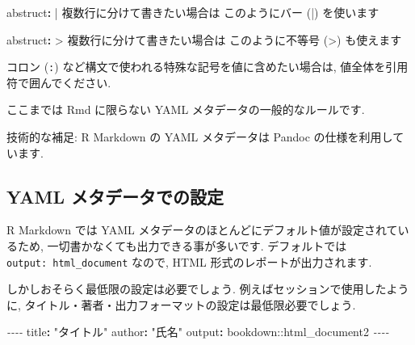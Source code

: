 \documentclass[
]{bxjsarticle}
\newenvironment{Shaded}{\begin{snugshade}}{\end{snugshade}}
\newcommand{\AttributeTok}[1]{\textcolor[rgb]{0.77,0.63,0.00}{#1}}
\newcommand{\CharTok}[1]{\textcolor[rgb]{0.31,0.60,0.02}{#1}}
\newcommand{\FunctionTok}[1]{\textcolor[rgb]{0.00,0.00,0.00}{#1}}
\newcommand{\KeywordTok}[1]{\textcolor[rgb]{0.13,0.29,0.53}{\textbf{#1}}}
\newcommand{\NormalTok}[1]{#1}
\newcommand{\PreprocessorTok}[1]{\textcolor[rgb]{0.56,0.35,0.01}{\textit{#1}}}
\newcommand{\StringTok}[1]{\textcolor[rgb]{0.31,0.60,0.02}{#1}}
\begin{document}
\begin{Shaded}
\begin{Highlighting}[numbers=left,,]
\FunctionTok{abstruct}\KeywordTok{: }\CharTok{|}
\NormalTok{  複数行に分けて書きたい場合は}
\NormalTok{  このようにバー (\textasciigrave{}|\textasciigrave{}) を使います}
\end{Highlighting}
\end{Shaded}

\begin{Shaded}
\begin{Highlighting}[numbers=left,,]
\FunctionTok{abstruct}\KeywordTok{: }\CharTok{\textgreater{}}
\NormalTok{  複数行に分けて書きたい場合は}
\NormalTok{  このように不等号 (\textasciigrave{}\textgreater{}\textasciigrave{}) も使えます}
\end{Highlighting}
\end{Shaded}

コロン (\texttt{:}) など構文で使われる特殊な記号を値に含めたい場合は, 値全体を引用符で囲んでください.

ここまでは Rmd に限らない YAML メタデータの一般的なルールです.

技術的な補足: R Markdown の YAML メタデータは Pandoc の仕様を利用しています.

\hypertarget{yaml-ux30e1ux30bfux30c7ux30fcux30bfux3067ux306eux8a2dux5b9a}{%
\subsection{YAML メタデータでの設定}\label{yaml-ux30e1ux30bfux30c7ux30fcux30bfux3067ux306eux8a2dux5b9a}}

R Markdown では YAML メタデータのほとんどにデフォルト値が設定されているため, 一切書かなくても出力できる事が多いです. デフォルトでは \texttt{output:\ html\_document} なので, HTML 形式のレポートが出力されます.

しかしおそらく最低限の設定は必要でしょう. 例えばセッションで使用したように, タイトル・著者・出力フォーマットの設定は最低限必要でしょう.

\begin{Shaded}
\begin{Highlighting}[numbers=left,,]
\PreprocessorTok{{-}{-}{-}{-}}
\FunctionTok{title}\KeywordTok{:}\AttributeTok{ }\StringTok{"タイトル"}
\FunctionTok{author}\KeywordTok{:}\AttributeTok{ }\StringTok{"氏名"}
\FunctionTok{output}\KeywordTok{:}\AttributeTok{ bookdown::html\_document2}
\PreprocessorTok{{-}{-}{-}{-}}
\end{Highlighting}
\end{Shaded}
\end{document}
